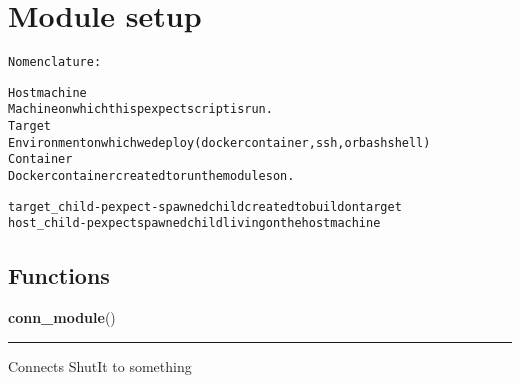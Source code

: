 %
%
%


\section{Module setup}

    \label{setup}
\begin{alltt}

Nomenclature:

Host machine
  Machine on which this pexpect script is run.
Target
  Environment on which we deploy (docker container, ssh, or bash shell)
Container
  Docker container created to run the modules on.

target\_child    - pexpect-spawned child created to build on target
host\_child      - pexpect spawned child living on the host machine
\end{alltt}



  \subsection{Functions}

    \label{setup:conn_module}

    \vspace{0.5ex}

\hspace{.8\funcindent}\begin{boxedminipage}{\funcwidth}

    \raggedright \textbf{conn\_module}()

    \vspace{-1.5ex}

    \rule{\textwidth}{0.5\fboxrule}
\setlength{\parskip}{2ex}
    Connects ShutIt to something

\setlength{\parskip}{1ex}
    \end{boxedminipage}


